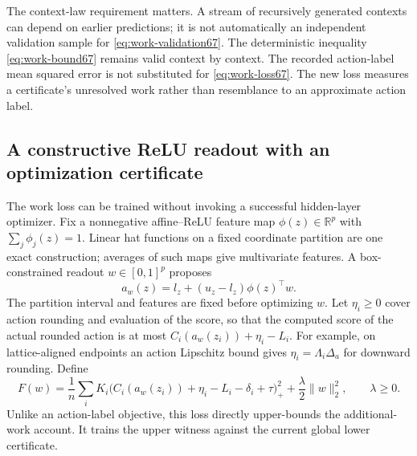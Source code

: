 The context-law requirement matters. A stream of recursively generated contexts can depend on earlier predictions; it is not automatically an independent validation sample for \eqref{eq:work-validation67}. The deterministic inequality \eqref{eq:work-bound67} remains valid context by context. The recorded action-label mean squared error is not substituted for \eqref{eq:work-loss67}. The new loss measures a certificate's unresolved work rather than resemblance to an approximate action label.

\subsection{A constructive ReLU readout with an optimization certificate}
The work loss can be trained without invoking a successful hidden-layer optimizer. Fix a nonnegative affine--ReLU feature map $\phi(z)\in\mathbb R^p$ with $\sum_j\phi_j(z)=1$. Linear hat functions on a fixed coordinate partition are one exact construction; averages of such maps give multivariate features. A box-constrained readout $w\in[0,1]^p$ proposes
\[
 a_w(z)=l_z+(u_z-l_z)\phi(z)^\top w.
\]
The partition interval and features are fixed before optimizing $w$. Let $\eta_i\ge0$ cover action rounding and evaluation of the score, so that the computed score of the actual rounded action is at most $C_i(a_w(z_i))+\eta_i-L_i$. For example, on lattice-aligned endpoints an action Lipschitz bound gives $\eta_i=\Lambda_i\Delta_a$ for downward rounding. Define
\begin{equation}\label{eq:readout-loss67}
 F(w)=\frac1n\sum_i K_i
 \bigl(C_i(a_w(z_i))+\eta_i-L_i-\delta_i+\tau\bigr)_+^2
                      +\frac\lambda2\|w\|_2^2,
 \qquad \lambda\ge0.
\end{equation}
Unlike an action-label objective, this loss directly upper-bounds the additional-work account. It trains the upper witness against the current global lower certificate.

